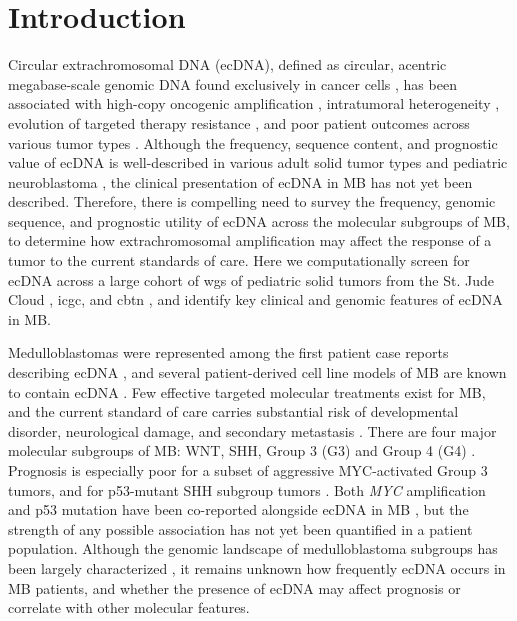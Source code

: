 \section{Introduction}
\par Circular extrachromosomal DNA (ecDNA), defined as circular, acentric megabase-scale genomic DNA found exclusively in cancer cells \cite{Verhaak_2019, bafna_2022}, has been associated with high-copy oncogenic amplification \cite{Turner_2017}, intratumoral heterogeneity \cite{Lange_2021, xu_2019}, evolution of targeted therapy resistance \cite{decarvalho_2018,Nathanson_2014}, and poor patient outcomes across various tumor types \cite{Kim_2020, Koche_2020}. Although the frequency, sequence content, and prognostic value of ecDNA is well-described in various adult solid tumor types \cite{Kim_2020} and pediatric neuroblastoma \cite{Koche_2020}, the clinical presentation of ecDNA in \gls{MB} has not yet been described. Therefore, there is compelling need to survey the frequency, genomic sequence, and prognostic utility of ecDNA across the molecular subgroups of \gls{MB}, to determine how extrachromosomal amplification may affect the response of a tumor to the current standards of care. Here we computationally screen for ecDNA across a large cohort of \gls{wgs} of pediatric solid tumors from the St. Jude Cloud \cite{stjude}, \gls{icgc}, and \gls{cbtn} \cite{cbtn}, and identify key clinical and genomic features of ecDNA in \gls{MB}.

\par Medulloblastomas were represented among the first patient case reports describing ecDNA \cite{Cox_1966,Herbert_1965}, and several patient-derived cell line models of MB are known to contain ecDNA \cite{Morton_2019}. Few effective targeted molecular treatments exist for MB, and the current standard of care carries substantial risk of developmental disorder, neurological damage, and secondary metastasis \cite{Salloum_2019}. There are four major molecular subgroups of MB: WNT, SHH, Group 3 (G3) and Group 4 (G4) \cite{Juraschka_2019}. Prognosis is especially poor for a subset of aggressive MYC-activated Group 3 tumors, and for p53-mutant SHH subgroup tumors \cite{Northcott_2017,Ramaswamy_2016}. Both \textit{MYC} amplification and p53 mutation have been co-reported alongside ecDNA in MB \cite{Ryan_2012,Rausch_2012}, but the strength of any possible association has not yet been quantified in a patient population. Although the genomic landscape of medulloblastoma subgroups has been largely characterized \cite{Northcott_2017}, it remains unknown how frequently ecDNA occurs in MB patients, and whether the presence of ecDNA may affect prognosis or correlate with other molecular features. 

